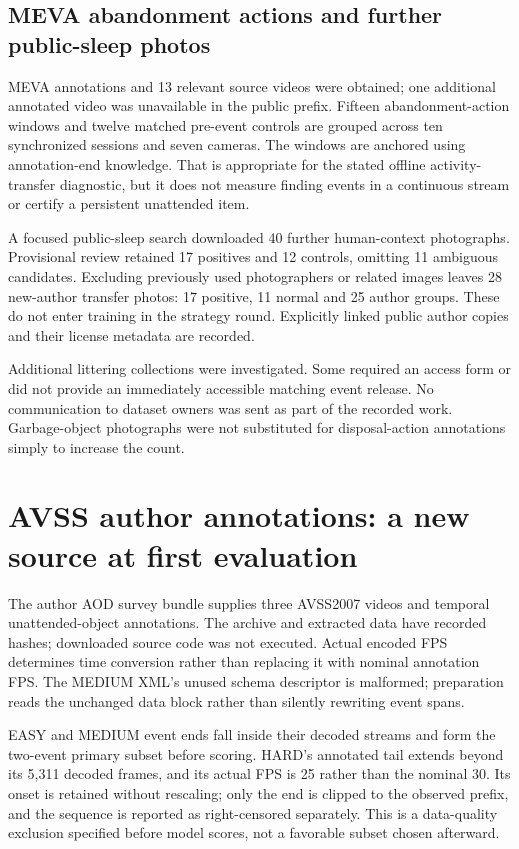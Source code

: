 \subsection{MEVA abandonment actions and further public-sleep photos}
MEVA annotations and 13 relevant source videos were obtained; one additional annotated video was unavailable in the public prefix. Fifteen abandonment-action windows and twelve matched pre-event controls are grouped across ten synchronized sessions and seven cameras. The windows are anchored using annotation-end knowledge. That is appropriate for the stated offline activity-transfer diagnostic, but it does not measure finding events in a continuous stream or certify a persistent unattended item.

A focused public-sleep search downloaded 40 further human-context photographs. Provisional review retained 17 positives and 12 controls, omitting 11 ambiguous candidates. Excluding previously used photographers or related images leaves 28 new-author transfer photos: 17 positive, 11 normal and 25 author groups. These do not enter training in the strategy round. Explicitly linked public author copies and their license metadata are recorded.

Additional littering collections were investigated. Some required an access form or did not provide an immediately accessible matching event release. No communication to dataset owners was sent as part of the recorded work. Garbage-object photographs were not substituted for disposal-action annotations simply to increase the count.

\section{AVSS author annotations: a new source at first evaluation}
The author AOD survey bundle supplies three AVSS2007 videos and temporal unattended-object annotations. The archive and extracted data have recorded hashes; downloaded source code was not executed. Actual encoded FPS determines time conversion rather than replacing it with nominal annotation FPS. The MEDIUM XML's unused schema descriptor is malformed; preparation reads the unchanged data block rather than silently rewriting event spans.

EASY and MEDIUM event ends fall inside their decoded streams and form the two-event primary subset before scoring. HARD's annotated tail extends beyond its 5,311 decoded frames, and its actual FPS is 25 rather than the nominal 30. Its onset is retained without rescaling; only the end is clipped to the observed prefix, and the sequence is reported as right-censored separately. This is a data-quality exclusion specified before model scores, not a favorable subset chosen afterward.

